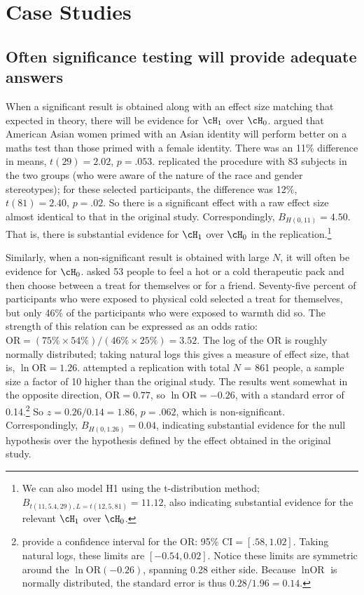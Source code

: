 \section{Case Studies}

\subsection{Often significance testing will provide adequate answers}

When a significant result is obtained along with an effect size matching that expected in theory, there will be evidence for $\cH_1$ over $\cH_0$.  argued that American Asian women primed with an Asian identity will perform better on a maths test than those primed with a female identity. There was an 11\% difference in means, $t(29) = 2.02$, $p = .053$.  replicated the procedure with 83 subjects in the two groups (who were aware of the nature of the race and gender stereotypes); for these selected participants, the difference was 12\%, $t(81) = 2.40$, $p = .02$.  So there is a significant effect with a raw effect size almost identical to that in the original study. Correspondingly, $B_{H(0, 11)} = 4.50$. That is, there is substantial evidence for $\cH_1$ over $\cH_0$ in the replication.\footnote{We can also model H1 using the t-distribution method; $B_{t(11, 5.4, 29),L = t(12, 5, 81)} = 11.12$, also indicating substantial evidence for the relevant $\cH_1$ over $\cH_0$.}

\newcommand{\OR}{\mbox{OR}}
\newcommand{\CI}{\mbox{CI}}
\newcommand{\SE}{\mbox{SE}}
Similarly, when a non-significant result is obtained with large $N$, it will often be evidence for $\cH_0$.  asked 53 people to feel a hot or a cold therapeutic pack and then choose between a treat for themselves or for a friend. Seventy-five percent of participants who were exposed to physical cold selected a treat for themselves, but only 46\% of the participants who were exposed to warmth did so. The strength of this relation can be expressed as an odds ratio: $\OR = (75\% \times 54\%)/(46\% \times 25\%) = 3.52$.  The log of the $\OR$ is roughly normally distributed; taking natural logs this gives a measure of effect size, that is, $\ln\OR = 1.26$.  attempted a replication with total $N$ = 861 people, a sample size a factor of 10 higher than the original study.  The results went somewhat in the opposite direction, $\OR = 0.77$, so $\ln\OR = -0.26$, with a standard error of 0.14.\footnote{ provide a confidence interval for the $\OR$: 95\% $\CI = [.58, 1.02]$.  Taking natural logs, these limits are $[-0.54, 0.02]$. Notice these limits are symmetric around the $\ln\OR (-0.26)$, spanning 0.28 either side. Because $\ln\OR$ is normally distributed, the standard error is thus $0.28/1.96 = 0.14$.} So $z = 0.26/0.14 = 1.86$, $p = .062$, which is non-significant. Correspondingly, $B_{H(0, 1.26)} = 0.04$, indicating substantial evidence for the null hypothesis over the hypothesis defined by the effect obtained in the original study.

